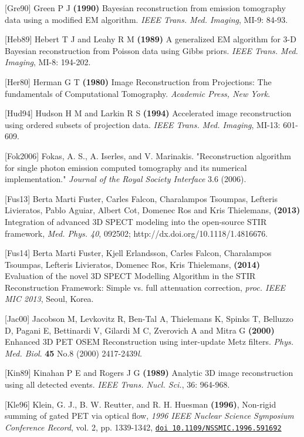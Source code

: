 \documentclass{article}
\def\url#1#2{\mbox{\href{#1}{\tt #2}}}
\begin{document}
{{{{{{ {[}Gre90] Green P J \textbf{(1990)} Bayesian reconstruction from emission 
tomography data using a modified EM algorithm. \textit{IEEE Trans. 
Med. Imaging}, MI-9: 84-93.


{[}Heb89] Hebert T J and Leahy R M \textbf{(1989)} A generalized EM 
algorithm for 3-D Bayesian reconstruction from Poisson data using 
Gibbs priors. \textit{IEEE Trans. Med. Imaging}, MI-8: 194-202.


{[}Her80] Herman G T \textbf{(1980)} Image Reconstruction from Projections: 
The fundamentals of Computational Tomography. \textit{Academic Press, 
New York}.

{[}Hud94] Hudson H M and Larkin R S \textbf{(1994)} Accelerated image 
reconstruction using ordered subsets of projection data. \textit{IEEE 
Trans. Med. Imaging}, MI-13: 601-609.

{[}Fok2006] Fokas, A. S., A. Iserles, and V. Marinakis. "Reconstruction algorithm for
single photon emission computed tomography and its numerical implementation." \textit{Journal of the Royal Society Interface} 3.6 (2006).

{[}Fus13]  Berta Marti Fuster, Carles Falcon, Charalampos Tsoumpas, Lefteris Livieratos, Pablo Aguiar, Albert Cot, Domenec Ros and Kris Thielemans, \textbf{ (2013)} Integration of advanced 3D SPECT modeling into the open-source STIR framework, \textit{Med. Phys. 40}, 092502; http://dx.doi.org/10.1118/1.4816676.

{[}Fus14] Berta Marti Fuster, Kjell Erlandsson, Carles Falcon, Charalampos Tsoumpas, Lefteris Livieratos, Domenec Ros, Kris Thielemans, \textbf{(2014)}  Evaluation of the novel 3D SPECT Modelling Algorithm in the STIR Reconstruction Framework: Simple vs. full attenuation correction, \textit{proc. IEEE MIC 2013}, Seoul, Korea.

{[}Jac00] Jacobson M, Levkovitz R, Ben-Tal A, Thielemans K, Spinks 
T, Belluzzo D, Pagani E, Bettinardi V, Gilardi M C, Zverovich 
A and Mitra G \textbf{(2000)} Enhanced 3D PET OSEM Reconstruction 
using inter-update Metz filters. \textit{Phys. Med. Biol}. \textbf{45} No.8 
(2000) 2417-2439\textit{l.}


{[}Kin89] Kinahan P E and Rogers J G \textbf{(1989)} Analytic 3D image 
reconstruction using all detected events. \textit{IEEE Trans. Nucl. 
Sci.}, 36: 964-968.


[Kle96]
Klein, G. J., B. W. Reutter, and R. H. Huesman \textbf{(1996)}, Non-rigid summing of gated PET via optical flow, \textit{1996 IEEE Nuclear
Science Symposium Conference Record},
vol. 2, pp. 1339-1342, 
\url{http://dx.doi.org/10.1109/NSSMIC.1996.591692}{doi 10.1109/NSSMIC.1996.591692}

}}}}}}
\end{document}
